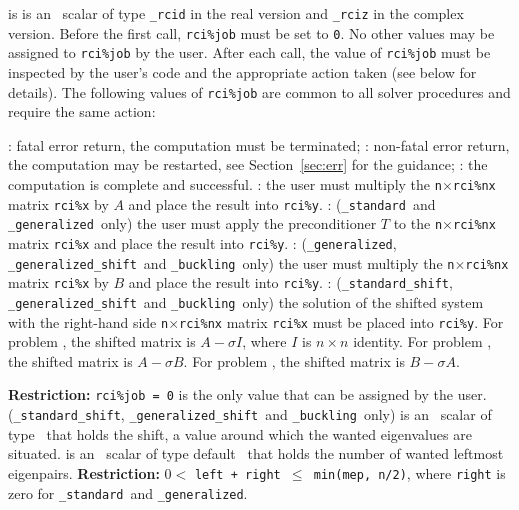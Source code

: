 \documentclass{spral}
\begin{document}
\begin{description}
%
 is is an \intentinout\ scalar  of type
{\tt \solver\_rcid} in the real version and
{\tt \solver\_rciz} in the complex version.
Before the first call, {\tt rci\%job} must be set to {\tt 0}.
No other values may be assigned to {\tt rci\%job} by the user.
After each call,
the value of {\tt rci\%job} must be inspected by the user's code
and the appropriate action taken (see below for details).
The following values of {\tt rci\%job}
are common to all solver procedures 
and require the same action: 
%
\begin{description}
%
: fatal error return, the computation must be terminated;
%
: 
non-fatal error return, the computation may be restarted,
see Section~\ref{sec:err} for the guidance;
%
: the computation is complete and successful.
%
: 
the user must multiply the {\tt n}$\times${\tt rci\%nx} matrix
{\tt rci\%x} by $A$ and place the result into {\tt rci\%y}.
%
: 
({\tt\solver\_standard}\ and {\tt\solver\_generalized}\ only)
the user must
apply the preconditioner $T$ to the {\tt n}$\times${\tt rci\%nx} matrix
{\tt rci\%x} and place the result into {\tt rci\%y}.
%
: 
({\tt\solver\_generalized}, {\tt\solver\_generalized\_shift}\
and {\tt\solver\_buckling}\ only)
the user must multiply the {\tt n}$\times${\tt rci\%nx} matrix
{\tt rci\%x} by $B$ and place the result into {\tt rci\%y}.
%
:
({\tt\solver\_standard\_shift}, {\tt\solver\_generalized\_shift}\
and {\tt\solver\_buckling}\ only)
the solution of the shifted system
with the right-hand side {\tt n}$\times${\tt rci\%nx} matrix {\tt rci\%x}
must be placed into {\tt rci\%y}.
For problem \Ref{evp}, the shifted matrix is $A - \sigma I$,
where $I$ is $n\times n$ identity.
For problem \Ref{evp.g}, the shifted matrix is $A - \sigma B$.
For problem \Ref{evp.b}, the shifted matrix is $B - \sigma A$.
%
\end{description}
%
{\bf Restriction:} 
{\tt rci\%job = 0} is the only value that can be assigned by the user.
%
\itt{sigma} 
({\tt \solver\_standard\_shift}, {\tt \solver\_generalized\_shift}\
and {\tt \solver\_buckling}\ only)
is an \intentin\ scalar of type \REALDP\
that holds the shift, 
a value around which the wanted eigenvalues %
are situated.
%
\itt{left} is an \intentin\ scalar of type default \Integer\ 
that holds the number of wanted leftmost eigenpairs.
{\bf Restriction:} {$0 <$ \tt left + right $\le$ min(mep, n/2)},
where {\tt right} is zero for 
{\tt\solver\_standard}\ and {\tt\solver\_generalized}.

\end{description}
\end{document}
